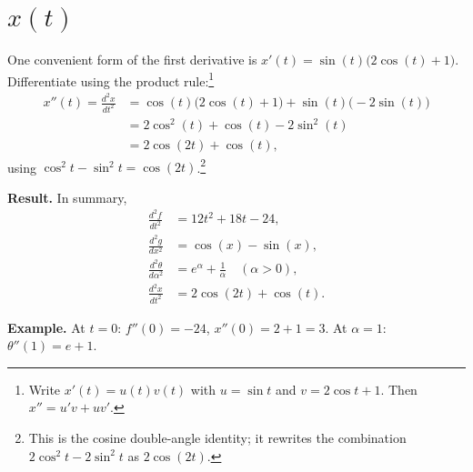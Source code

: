 \documentclass[11pt]{article}
\newcommand{\resultbox}[1]{%
  \begin{savenotes}%
  \begingroup\setlength{\fboxsep}{10pt}\noindent
  \colorbox{purple!8}{\parbox{\dimexpr\linewidth-2\fboxsep\relax}{\textbf{Result. }#1}}
  \endgroup
  \end{savenotes}%
}
\newcommand{\examplebox}[1]{%
  \begin{savenotes}%
  \begingroup\setlength{\fboxsep}{10pt}\noindent
  \colorbox{green!8}{\parbox{\dimexpr\linewidth-2\fboxsep\relax}{\textbf{Example. }#1}}
  \endgroup
  \end{savenotes}%
}
\begin{document}
\section*{\(x(t)\)}
One convenient form of the first derivative is \(x'(t)=\sin(t)\bigl(2\cos(t)+1\bigr)\).
Differentiate using the product rule:\footnote{Write \(x'(t)=u(t)v(t)\) with
\(u=\sin t\) and \(v=2\cos t+1\). Then \(x''=u'v+uv'\).}
\[
\begin{aligned}
x''(t)=\frac{d^2x}{dt^2}
&=\cos(t)\bigl(2\cos(t)+1\bigr)+\sin(t)\bigl(-2\sin(t)\bigr)\\
&=2\cos^2(t)+\cos(t)-2\sin^2(t)\\
&=2\cos(2t)+\cos(t),
\end{aligned}
\]
using \(\cos^2 t-\sin^2 t=\cos(2t)\).\footnote{This is the cosine double-angle identity;
it rewrites the combination \(2\cos^2 t-2\sin^2 t\) as \(2\cos(2t)\).}

\resultbox{In summary,
\[
\begin{aligned}
\frac{d^2f}{dt^2} &= 12t^2+18t-24,\\[2pt]
\frac{d^2g}{dx^2} &= \cos(x)-\sin(x),\\[2pt]
\frac{d^2\theta}{d\alpha^2} &= e^\alpha+\frac{1}{\alpha}\quad(\alpha>0),\\[2pt]
\frac{d^2x}{dt^2} &= 2\cos(2t)+\cos(t).
\end{aligned}
\]}

\examplebox{At \(t=0\): \(f''(0)=-24\), \(x''(0)=2+1=3\). At \(\alpha=1\):
\(\theta''(1)=e+1\).}
\end{document}
